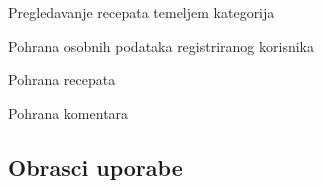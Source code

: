 \begin{packed_enum}
\begin{packed_enum}
				\end{packed_enum}
				
				\item  {}
				
				\begin{packed_enum}
					
					\item Pregledavanje recepata temeljem kategorija
					
				\end{packed_enum}
				
				
				\item  {}
				
				\begin{packed_enum}
					
					\item Pohrana osobnih podataka registriranog korisnika
					\item Pohrana recepata
					\item Pohrana komentara
					
				\end{packed_enum}
			\end{packed_enum}
			
			\eject 
			
			
				
			\subsection{Obrasci uporabe}
				
